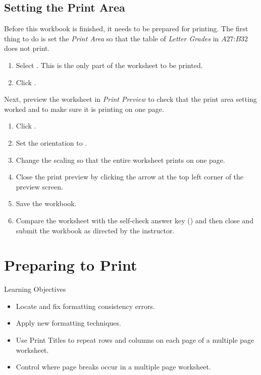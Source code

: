 \subsection{Setting the Print Area}

Before this workbook is finished, it needs to be prepared for printing. The first thing to do is set the \textit{Print Area} so that the table of \textit{Letter Grades} in $ A27 $:$ B32 $ does not print.

\begin{enumerate}
	\item Select . This is the only part of the worksheet to be printed.
	\item Click .
\end{enumerate}

Next, preview the worksheet in \textit{Print Preview} to check that the print area setting worked and to make sure it is printing on one page.

\begin{enumerate}
	\item Click .
	\item Set the orientation to .
	\item Change the scaling so that the entire worksheet prints on one page.
	\item Close the print preview by clicking the arrow at the top left corner of the preview screen.
	\item Save the  workbook.
	\item Compare the worksheet with the self-check answer key () and then close and submit the  workbook as directed by the instructor.
\end{enumerate}

\section{Preparing to Print}

\begin{center}
	\begin{objbox}{Learning Objectives}
		\begin{itemize}
			\setlength{\itemsep}{0pt}
			\setlength{\parskip}{0pt}
			\setlength{\parsep}{0pt}

			\item Locate and fix formatting consistency errors.
			\item Apply new formatting techniques.
			\item Use Print Titles to repeat rows and columns on each page of a multiple page worksheet.
			\item Control where page breaks occur in a multiple page worksheet.
			
		\end{itemize}
	\end{objbox}
\end{center}

